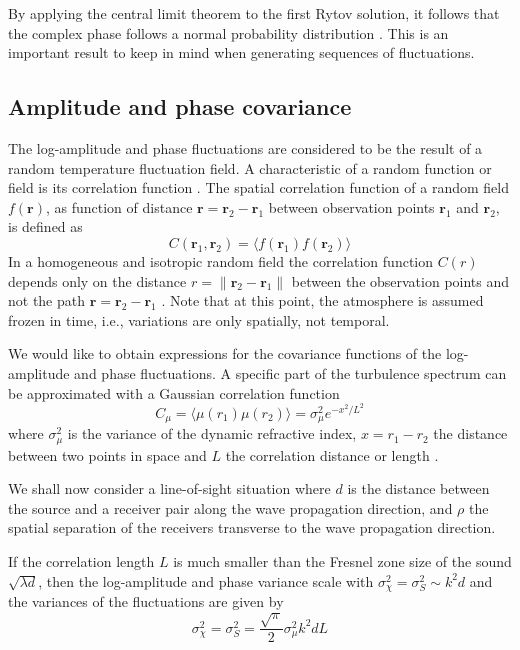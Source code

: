 By applying the central limit theorem to the first Rytov solution, it follows that the complex phase follows a normal probability distribution \cite{Jurado-navas2006}.
This is an important result to keep in mind when generating sequences of fluctuations.

\subsection{Amplitude and phase covariance}
The log-amplitude and phase fluctuations are considered to be the result of a
random temperature fluctuation field. A characteristic of a random function or
field is its correlation function \cite{Tatarskii1971}. The spatial correlation
function of a random field $f(\mathbf{r})$, as function of distance $\mathbf{r}=\mathbf{r}_2-\mathbf{r}_1$
between observation points $\mathbf{r}_1$ and $\mathbf{r}_2$, is defined as
\begin{equation}
 C(\mathbf{r}_1, \mathbf{r}_2) = \langle f(\mathbf{r}_1)  f(\mathbf{r}_2) \rangle
\end{equation}
In a homogeneous and isotropic random field the correlation function
$C(r)$ depends only on the distance $r = \lVert \mathbf{r}_2-\mathbf{r}_1 \rVert$ between the observation points and not the path $\mathbf{r}=\mathbf{r}_2-\mathbf{r}_1$ \cite{Salomons2001}.
Note that at this point, the atmosphere is assumed frozen in time, i.e., variations are only spatially, not temporal.

We would like to obtain expressions for the covariance functions of the
log-amplitude and phase fluctuations. A specific part of the turbulence spectrum
can be approximated with a Gaussian correlation function
\begin{equation}
 C_{\mu} = \langle \mu(r_1) \mu(r_2) \rangle = \sigma_{\mu}^2 e^{-x^2/L^2}
\end{equation}
where $\sigma_{\mu}^2$ is the variance of the dynamic refractive index,
$x=r_1-r_2$ the distance between two points in space and $L$ the correlation
distance or length \cite{Ishimaru1997}.

We shall now consider a line-of-sight situation where $d$ is the
distance between the source and a receiver pair along the wave propagation
direction, and $\rho$ the spatial separation of the receivers transverse to the
wave propagation direction.

If the correlation length $L$ is much smaller than the Fresnel zone size of the sound
$\sqrt{\lambda d}$, then the log-amplitude and phase variance scale with
$\sigma_{\chi}^2=\sigma_{S}^2 \sim k^2 d$
\cite{Ishimaru1997} and the variances of the fluctuations are given by \cite{Daigle1983}
\begin{equation}\label{eq:model_daigle}
 \sigma_{\chi}^2 = \sigma_{S}^2 = \frac{\sqrt{\pi}}{2} \sigma_{\mu}^2 k^2 d L
\end{equation}

